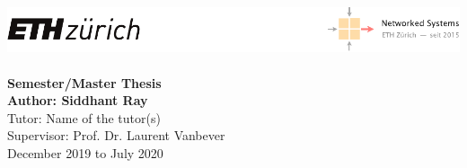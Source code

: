 \documentclass[11pt,oneside]{book}
\begin{document}
\begin{titlepage}
    \centering
    \includegraphics[width=\textwidth]{figures/eth-nsg-header}\\[60mm]
    {\Huge\bf{}}\\[10mm]
    {\Large\bf\sf Semester/Master Thesis}\\[3mm]
    {\Large\bf\sf Author: Siddhant Ray } \\[5mm]
    {\sf Tutor: Name of the tutor(s)}\\[5mm]
    {\sf Supervisor: Prof. Dr. Laurent Vanbever}\\[30mm]
    {\sf December 2019 to July 2020}
\end{titlepage}

\thispagestyle{empty}
\newpage
{}


\clearpage
\setcounter{tocdepth}{2}
\tableofcontents
\clearpage









\clearpage




\clearpage
\appendix
{}


\end{document}
